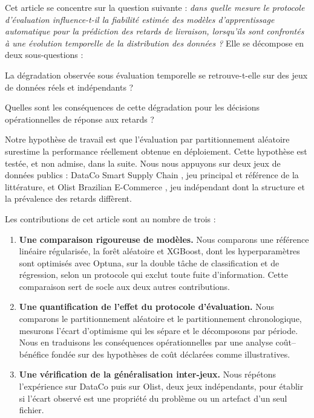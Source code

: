 \documentclass[11pt,a4paper]{article}
\theoremstyle{definition}
\begin{document}
Cet article se concentre sur la question suivante : \emph{dans quelle mesure le protocole d'évaluation influence-t-il la fiabilité estimée des modèles d'apprentissage automatique pour la prédiction des retards de livraison, lorsqu'ils sont confrontés à une évolution temporelle de la distribution des données ?} Elle se décompose en deux sous-questions :
\begin{description}[leftmargin=2.2em,style=nextline]
  \item[RQ1] La dégradation observée sous évaluation temporelle se retrouve-t-elle sur des jeux de données réels et indépendants ?
  \item[RQ2] Quelles sont les conséquences de cette dégradation pour les décisions opérationnelles de réponse aux retards ?
\end{description}
Notre hypothèse de travail est que l'évaluation par partitionnement aléatoire surestime la performance réellement obtenue en déploiement. Cette hypothèse est testée, et non admise, dans la suite. Nous nous appuyons sur deux jeux de données publics : DataCo Smart Supply Chain \cite{constante2019dataco}, jeu principal et référence de la littérature, et Olist Brazilian E-Commerce \cite{olist2018brazilian}, jeu indépendant dont la structure et la prévalence des retards diffèrent.

Les contributions de cet article sont au nombre de trois :
\begin{enumerate}[label=(\roman*)]
  \item \textbf{Une comparaison rigoureuse de modèles.} Nous comparons une référence linéaire régularisée, la forêt aléatoire et XGBoost, dont les hyperparamètres sont optimisés avec Optuna, sur la double tâche de classification et de régression, selon un protocole qui exclut toute fuite d'information. Cette comparaison sert de socle aux deux autres contributions.
  \item \textbf{Une quantification de l'effet du protocole d'évaluation.} Nous comparons le partitionnement aléatoire et le partitionnement chronologique, mesurons l'écart d'optimisme qui les sépare et le décomposons par période. Nous en traduisons les conséquences opérationnelles par une analyse coût--bénéfice fondée sur des hypothèses de coût déclarées comme illustratives.
  \item \textbf{Une vérification de la généralisation inter-jeux.} Nous répétons l'expérience sur DataCo puis sur Olist, deux jeux indépendants, pour établir si l'écart observé est une propriété du problème ou un artefact d'un seul fichier.
\end{enumerate}
\end{document}
